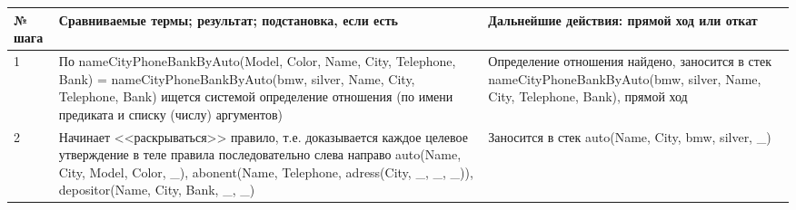 \documentclass[a4paper,14pt]{extreport} %
\begin{document}
\begin{longtable}{|p{1.1cm}|p{8.5cm}|p{7cm}|}
	\hline
 	№ шага & Сравниваемые термы; результат; подстановка, если есть  & Дальнейшие действия: прямой ход или откат \\ \hline
	1 & По nameCityPhoneBankByAuto(Model, Color, Name, City, Telephone, Bank) = nameCityPhoneBankByAuto(bmw, silver, Name, City, Telephone, Bank) ищется системой определение отношения (по имени предиката и списку (числу) аргументов) & Определение отношения найдено, заносится в стек nameCityPhoneBankByAuto(bmw, silver, Name, City, Telephone, Bank), прямой ход \\ \hline
	2 & Начинает <<раскрываться>> правило, т.е. доказывается каждое целевое утверждение в теле правила последовательно слева направо
	auto(Name, City, Model, Color, \_),
    abonent(Name, Telephone, adress(City, \_, \_, \_)),
    depositor(Name, City, Bank, \_, \_)
	
	& Заносится в стек auto(Name, City, bmw, silver, \_) \\ \hline


\end{longtable}
\end{document}
